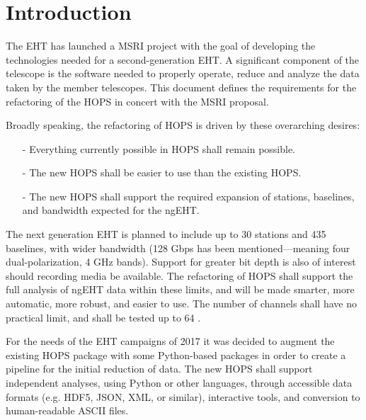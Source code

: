 %
%

\section{Introduction}
\label{sec:intro}

The \ac{EHT} has launched a \ac{MSRI} project with the goal of developing
the technologies needed for a second-generation \acs{EHT}. 
A significant component of the telescope is the software needed to 
properly operate, reduce and analyze the data taken by the member telescopes.
This document defines the requirements for the refactoring of the \ac{HOPS} in 
concert with the \acs{MSRI} proposal. 

Broadly speaking, the refactoring of \acs{HOPS} is driven by
these overarching desires:

\begin{itemize}
\item[-] Everything currently possible in \ac{HOPS} shall remain possible.

\item[-] The new HOPS shall be easier to use than the existing \acs{HOPS}.
 
\item[-] The new \acs{HOPS} shall support the required expansion of stations, 
baselines, and bandwidth expected for the ngEHT.

\end{itemize}

The next generation \acs{EHT} is planned to include up to \TBR{} 30 stations
and 435 baselines, with wider bandwidth (128 Gbps has been mentioned---meaning
four dual-polarization, 4 GHz bands). Support for greater bit depth is
also of interest should recording media be available.  The refactoring
of \ac{HOPS} shall support the full analysis of ngEHT data within these limits,
and will be made smarter, more automatic, more robust, and easier to use. The
number of channels shall have no practical limit, and shall be tested up to 64 \TBR{}.


For the needs of the \acs{EHT} campaigns of 2017 it was decided to augment
the existing HOPS package with some Python-based packages in order to
create a pipeline for the initial reduction of data. The new \ac{HOPS} shall
support independent analyses, using Python or other languages, through
accessible data formats (e.g. HDF5, JSON, XML, or similar), interactive tools,
and conversion to human-readable ASCII files. 

